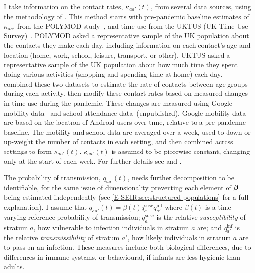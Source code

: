 \documentclass[thesis.tex]{subfiles}
\begin{document}
I take information on the contact rates, $\kappa_{aa'}(t)$, from several data sources, using the methodology of \textcite{vanleeuwenTime,vanleeuwenAugmenting}.
This method starts with pre-pandemic baseline estimates of $\kappa_{aa'}$ from the POLYMOD study~\autocite{mossongSocial}, and time use from the UKTUS (UK Time Use Survey)~\autocite{UKTUS}.
POLYMOD asked a representative sample of the UK population about the contacts they make each day, including information on each contact's age and location (home, work, school, leisure, transport, or other).
UKTUS asked a representative sample of the UK population about how much time they spent doing various activities (\eg shopping and spending time at home) each day.
\Textcite{vanleeuwenAugmenting} combined these two datasets to estimate the rate of contacts between age groups during each activity.
\Textcite{birrellRealtime} then modify these contact rates based on measured changes in time use during the pandemic.
These changes are measured using Google mobility data~\autocite{googleCOVID19} and school attendance data~(unpublished).
Google mobility data are based on the location of Android users over time, relative to a pre-pandemic baseline.
The mobility and school data are averaged over a week, used to down or up-weight the number of contacts in each setting, and then combined across settings to form $\kappa_{aa'}(t)$.
$\kappa_{aa'}(t)$ is assumed to be piecewise constant, changing only at the start of each week.
For further details see \textcite{vanleeuwenAugmenting} and \textcite[supplementary material]{birrellRealtime}.

The probability of transmission, $q_{aa'}(t)$, needs further decomposition to be identifiable, for the same issue of dimensionality preventing each element of $\bm{\beta}$ being estimated independently (see \cref{E-SEIR:sec:structured-populations} for a full explanation).
I assume that $q_{aa'}(t) = \beta(t) q^\text{susc}_{a} q^\text{inf}_{a'}$ where $\beta(t)$ is a time-varying reference probability of transmission; $q^\text{susc}_a$ is the relative \emph{susceptibility} of stratum $a$, \ie how vulnerable to infection individuals in stratum $a$ are; and $q^\text{inf}_{a'}$ is the relative \emph{transmissibility} of stratum $a'$, \ie how likely individuals in stratum $a$ are to pass on an infection.
These measures include both biological differences, \eg due to differences in immune systems, or behavioural, \eg if infants are less hygienic than adults.
\end{document}
